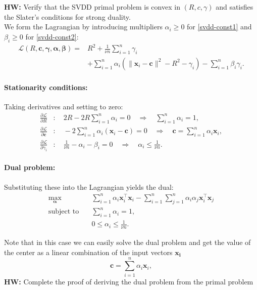 \documentclass[11pt]{report}
\begin{document}
\textbf{HW:} Verify that the SVDD primal problem is convex in $(R, c, \gamma)$ and satisfies the Slater's conditions for strong duality. \cite{chang2013svdd} \\

We form the Lagrangian by introducing multipliers $\alpha_i \geq 0$ for \eqref{svdd-const1} and $\beta_i \geq 0$ for \eqref{svdd-const2}:
\begin{align}
\mathcal{L}(R, \mathbf{c}, \boldsymbol{\gamma}, \boldsymbol{\alpha}, \boldsymbol{\beta}) 
= & R^2 + \frac{1}{\nu n} \sum_{i=1}^n \gamma_i \nonumber \\
& + \sum_{i=1}^n \alpha_i \left( \|\mathbf{x}_i - \mathbf{c} \|^2 - R^2 - \gamma_i \right) 
- \sum_{i=1}^n \beta_i \gamma_i.
\end{align}

\paragraph{Stationarity conditions:}
Taking derivatives and setting to zero:
\begin{align}
\frac{\partial \mathcal{L}}{\partial R} & : \quad 2R - 2R \sum_{i=1}^n \alpha_i = 0 
\quad \Rightarrow \quad \sum_{i=1}^n \alpha_i = 1, \\
\frac{\partial \mathcal{L}}{\partial \mathbf{c}} & : \quad -2 \sum_{i=1}^n \alpha_i (\mathbf{x}_i - \mathbf{c}) = 0
\quad \Rightarrow \quad \mathbf{c} = \sum_{i=1}^n \alpha_i \mathbf{x}_i, \\
\frac{\partial \mathcal{L}}{\partial \gamma_i} & : \quad \frac{1}{\nu n} - \alpha_i - \beta_i = 0
\quad \Rightarrow \quad \alpha_i \leq \frac{1}{\nu n}.
\end{align}

\paragraph{Dual problem:}
Substituting these into the Lagrangian yields the dual:
\begin{align}
\max_{\boldsymbol{\alpha}} \quad & 
\sum_{i=1}^n \alpha_i \mathbf{x}_i^\top \mathbf{x}_i 
- \sum_{i=1}^n \sum_{j=1}^n \alpha_i \alpha_j \mathbf{x}_i^\top \mathbf{x}_j \\
\text{subject to} \quad & 
\sum_{i=1}^n \alpha_i = 1, \\
& 0 \leq \alpha_i \leq \frac{1}{\nu n}.
\end{align}

Note that in this case we can easily solve the dual problem and get the value of the center as a linear combination of the input vectors $\boldsymbol{x_i}$
\[\mathbf{c} = \sum_{i=1}^n \alpha_i \mathbf{x}_i,\]
\textbf{HW: }Complete the proof of deriving the dual problem from the primal problem
\end{document}
